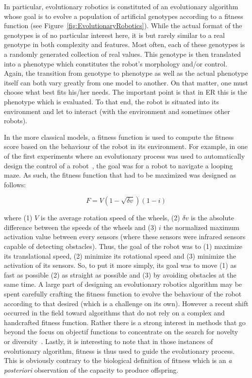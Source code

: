     In particular, evolutionary robotics is constituted of an evolutionary algorithm whose goal is to evolve a population of artificial genotypes according to a fitness function (see Figure~\ref{fig:EvolutionaryRobotics}). While the actual format of the genotypes is of no particular interest here, it is but rarely similar to a real genotype in both complexity and features. Most often, each of these genotypes is a randomly generated collection of real values. This genotype is then translated into a phenotype which constitutes the robot's morphology and/or control. Again, the transition from genotype to phenotype as well as the actual phenotype itself can both vary greatly from one model to another. On that matter, one must choose what best fits his/her needs. The important point is that in ER this is the phenotype which is evaluated. To that end, the robot is situated into its environment and let to interact (with the environment and sometimes other robots). 

    
    In the more classical models, a fitness function is used to compute the fitness score based on the behaviour of the robot in its environment. For example, in one of the first experiments where an evolutionary process was used to automatically design the control of a robot~\parencite{Floreano1994}, the goal was for a robot to navigate a looping maze. As such, the fitness function that had to be maximized was designed as follows:

    \[
      F = V(1-\sqrt{\delta v})(1-i)
    \]

    where (1) $V$ is the average rotation speed of the wheels, (2) $\delta v$ is the absolute difference between the speeds of the wheels and (3) $i$ the normalized maximum activation value between every sensors (where these sensors were infrared sensors capable of detecting obstacles). Thus, the goal of the robot was to (1) maximize its translational speed, (2) minimize its rotational speed and (3) minimize the activation of its sensors. So, to put it more simply, its goal was to move (1) as fast as possible (2) as straight as possible and (3) by avoiding obstacles at the same time. A large part of designing an evolutionary robotics algorithm may be spent carefully crafting the fitness function to evolve the behaviour of the robot according to that desired (which is a challenge on its own). However a recent shift occurred in the field toward algorithms that do not rely on a complex and handcrafted fitness function. Rather there is a strong interest in methods that go beyond the focus on objectif functions to concentrate on the search for novelty~\parencite{Lehman2008, Lehman2011} or diversity~\parencite{Mouret2012a}. Lastly, it is interesting to note that in those instances of evolutionary algorithm, fitness is thus used to guide the evolutionary process. This is obviously contrary to the biological definition of fitness which is an \emph{a posteriori} observation of the capacity to produce offspring. 

